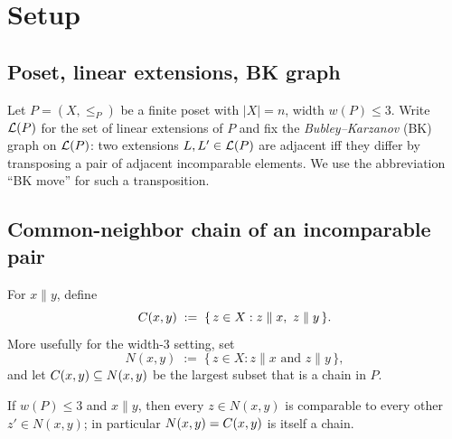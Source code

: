 
\begin{abstract}
Fix a width-$3$ poset $P$ and a rich incomparable pair $x\parallel y$ sharing
a long common neighbor chain $\Cxy$.
We construct a \emph{good fiber} $\Fxy\subseteq \LP$ carrying an explicit
coordinate map $\piXY:\Fxy\to \Dxy\subseteq [0,\txy]^2$ such that (i) the domain
$\Dxy$ is order-convex, (ii) BK moves inside $\Fxy$ are exactly unit grid moves
in $(i,j)$, and (iii) the complementary ``bad'' set is at most $1$-dimensional:
it is covered by $O(1)$ strips of width $O(\txy)$ and total mass
$O(\txy\cdot |\Fxy|^{1/2})$ in a sense made precise below.
This is the width-$3$ interface classification used by Steps 2--7.
A corollary extracts the commuting-square structure on overlaps of two rich
interfaces needed in Step~4, and a triple-overlap corollary extracts a
local $\Z^3$ commuting-cube model on positive-density triple overlaps,
needed for Step~7 (gap G4).
\end{abstract}

\section{Setup}

\subsection{Poset, linear extensions, BK graph}

Let $P=(X,\le_P)$ be a finite poset with $|X|=n$, width $w(P)\le 3$.
Write $\mathcal{L}(P)$ for the set of linear extensions of $P$ and fix the
\emph{Bubley--Karzanov} (BK) graph on $\mathcal{L}(P)$: two extensions $L,L'\in\mathcal{L}(P)$ are
adjacent iff they differ by transposing a pair of adjacent incomparable
elements. We use the abbreviation ``BK move'' for such a transposition.

\subsection{Common-neighbor chain of an incomparable pair}

For $x\parallel y$, define
\[
C(x,y) \;:=\; \{\,z\in X : z\parallel x,\ z\parallel y\,\}.
\]
More usefully for the width-$3$ setting, set
\[
N(x,y) \;:=\; \{\,z\in X : z\parallel x\text{ and }z\parallel y\,\},
\]
and let $C(x,y)\subseteq N(x,y)$ be the largest subset that is a chain in $P$.

\begin{lemma}\label{lem:CNchain-width3}
If $w(P)\le 3$ and $x\parallel y$, then every $z\in N(x,y)$ is comparable to every other $z'\in N(x,y)$; in particular $N(x,y)=C(x,y)$ is itself a chain.
\end{lemma}

